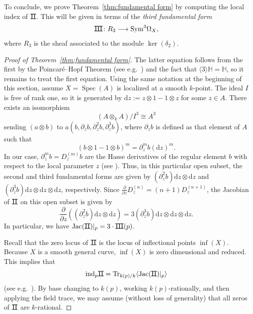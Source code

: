 \documentclass[12pt]{amsart}
\numberwithin{equation}{section}
\theoremstyle{plain}
\theoremstyle{definition}
\newcommand{\mb}[1]{\mathbb{#1}}
\newcommand{\Spec}{\operatorname{Spec}}
\newcommand{\Tr}{\mathrm{Tr}}
\newcommand{\ind}{\mathrm{ind}}
\newcommand{\Sym}{\mathrm{Sym}}
\newcommand{\Jac}{\operatorname{Jac}}
\renewcommand{\d}{\mathrm{d}}
\newcommand{\II}{\sbox0{II}\dimen0=\dimexpr\wd0+1pt\relax
  \makebox[\dimen0]{\rlap{\vrule width\dimen0 height 0.07ex depth 0.07ex}%
    \rlap{\vrule width\dimen0 height\dimexpr\ht0+0.07ex\relax 
            depth\dimexpr-\ht0+0.07ex\relax}%
    \kern.5pt \textnormal{II}\kern.5pt}}
\newcommand{\III}{\sbox0{III}\dimen0=\dimexpr\wd0+1pt\relax
  \makebox[\dimen0]{\rlap{\vrule width\dimen0 height 0.07ex depth 0.07ex}%
    \rlap{\vrule width\dimen0 height\dimexpr\ht0+0.07ex\relax 
            depth\dimexpr-\ht0+0.07ex\relax}%
    \kern.5pt \textnormal{III}\kern.5pt}}
\begin{document}
To conclude, we prove Theorem~\ref{thm:fundamental form} by computing the local index of $\II$. This will be given in terms of the \emph{third fundamental form}
\[\III\colon R_3\longrightarrow\Sym^3\Omega_X,\]
where $R_3$ is the sheaf associated to the module $\ker(\delta_2)$.

\begin{proof}[Proof of Theorem~\ref{thm:fundamental form}]
    The latter equation follows from the first by the Poincar\'e--Hopf Theorem (see e.g.~\cite[Theorem~1.1]{BW23}) and the fact that $\langle 3\rangle\mb{H}=\mb{H}$, so it remains to treat the first equation. 
    Using the same notation at the beginning of this section, assume $X=\Spec(A)$ is localized at a smooth $k$-point. The ideal $I$ is free of rank one, so it is generated by $\d z:=z\otimes 1-1\otimes z$ for some $z\in A$. There exists an isomorphism
    \[(A\otimes_k A)/I^{3}\cong A^3\]
    sending $(a\otimes b)$ to $a(b, \partial_z b, \partial_z^2 b, \partial_z^3 b)$, where $\partial_zb$ is defined as that element of $A$ such that
    \[(b\otimes 1 - 1\otimes b)^m= \partial_z^mb(\d z)^m.\]
    In our case, $\partial_z^mb=D_z^{(m)}b$ are the Hasse derivatives of the regular element $b$ with respect to the local parameter $z$ (see \cite[Note~6.4.2]{MR1308020}). Thus, in this particular open subset, the second and third fundamental forms are given by $(\partial_z^2b) \d z\otimes \d z$ and $(\partial_z^3b)\d z\otimes\d z\otimes\d z$, respectively. Since $\frac{\partial}{\partial z}D^{(n)}_z=(n+1)D^{(n+1)}_z$, the Jacobian of $\II$ on this open subset is given by
    \[\frac{\partial}{\partial z}((\partial^2_z b)\d z\otimes\d z)=3(\partial^3_z b)\d z\otimes\d z\otimes\d z.\]
    In particular, we have $\Jac(\II)|_p=3\cdot\III(p)$.
    
    Recall that the zero locus of $\II$ is the locus of inflectional points $\inf(X)$. Because $X$ is a smooth general curve, $\inf(X)$ is zero dimensional and reduced. This implies that
    \begin{equation}\label{eq:II}
    \ind_p\II=\Tr_{k(p)/k}\langle\Jac(\II)|_{p}\rangle
    \end{equation}
    (see e.g.~\cite[p.~692]{EnrichedCubicSurface}). By base changing to $k(p)$, working $k(p)$-rationally, and then applying the field trace, we may assume (without loss of generality) that all zeros of $\II$ are $k$-rational. 
    

\end{proof}
\end{document}
